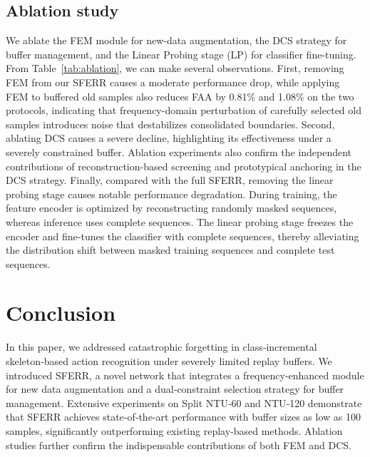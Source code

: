 \documentclass[journal]{IEEEtran}
\begin{document}
\subsection{Ablation study}
We ablate the FEM module for new-data augmentation, the DCS strategy for buffer management, and the Linear Probing stage (LP) for classifier fine-tuning.
From Table~\ref{tab:ablation}, we can make several observations.
First, removing FEM from our SFERR causes a moderate performance drop, while applying FEM to buffered old samples also reduces FAA by 0.81\% and 1.08\% on the two protocols, indicating that frequency-domain perturbation of carefully selected old samples introduces noise that destabilizes consolidated boundaries.
Second, ablating DCS causes a severe decline, highlighting its effectiveness under a severely constrained buffer.
Ablation experiments also confirm the independent contributions of reconstruction-based screening and prototypical anchoring in the DCS strategy.
Finally, compared with the full SFERR, removing the linear probing stage causes notable performance degradation.
During training, the feature encoder is optimized by reconstructing randomly masked sequences, whereas inference uses complete sequences. 
The linear probing stage freezes the encoder and fine-tunes the classifier with complete sequences, thereby alleviating the distribution shift between masked training sequences and complete test sequences.

\section{Conclusion}
In this paper, we addressed catastrophic forgetting in class‑incremental skeleton‑based action recognition under severely limited replay buffers.
We introduced SFERR, a novel network that integrates a frequency‑enhanced module for new data augmentation and a dual‑constraint selection strategy for buffer management.
Extensive experiments on Split NTU‑60 and NTU‑120 demonstrate that SFERR achieves state‑of‑the‑art performance with buffer sizes as low as 100 samples, significantly outperforming existing replay‑based methods.
Ablation studies further confirm the indispensable contributions of both FEM and DCS.


\end{document}
